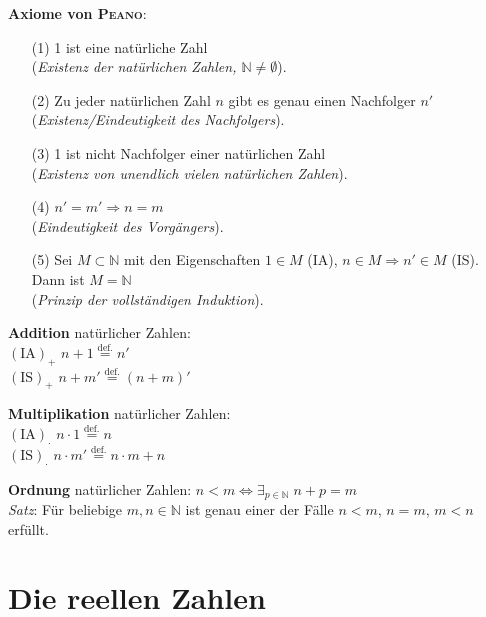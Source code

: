 \textbf{Axiome von \textsc{Peano}}:
\begin{itemize}
    \item[(1)] 1 ist eine natürliche Zahl \\
    (\emph{Existenz der natürlichen Zahlen, $\mathbb{N} \not= \emptyset$}).

    \item[(2)] Zu jeder natürlichen Zahl $n$ gibt es genau einen
    Nachfolger $n'$ \\
    (\emph{Existenz/Eindeutigkeit des Nachfolgers}).

    \item[(3)] 1 ist nicht Nachfolger einer natürlichen Zahl \\
    (\emph{Existenz von unendlich vielen natürlichen Zahlen}).

    \item[(4)] $n' = m' \Rightarrow n = m$ \\
    (\emph{Eindeutigkeit des Vorgängers}).

    \item[(5)] Sei $M \subset \mathbb{N}$ mit den Eigenschaften
    $1 \in M$ (IA), $n \in M \Rightarrow n' \in M$ (IS).
    Dann ist $M = \mathbb{N}$ \\
    (\emph{Prinzip der vollständigen Induktion}).
\end{itemize}

\linie

\textbf{Addition} natürlicher Zahlen: \\
$(\text{IA})_{\boldsymbol{+}}$ $n + 1 \overset{\text{def.}}{=} n'$ \\
$(\text{IS})_{\boldsymbol{+}}$ $n + m' \overset{\text{def.}}{=} (n + m)'$

\textbf{Multiplikation} natürlicher Zahlen: \\
$(\text{IA})_{\boldsymbol{\cdot}}$ $n \cdot 1 \overset{\text{def.}}{=} n$ \\
$(\text{IS})_{\boldsymbol{\cdot}}$ $n \cdot m' \overset{\text{def.}}{=}
n \cdot m + n$

\textbf{Ordnung} natürlicher Zahlen:
$n < m \Leftrightarrow \exists_{p \in \mathbb{N}}\; n + p = m$ \\
\emph{Satz}: Für beliebige $m, n \in \mathbb{N}$ ist genau einer der Fälle
$n < m$, $n = m$, $m < n$ erfüllt.

\pagebreak

\section{%
    Die reellen Zahlen%
}

